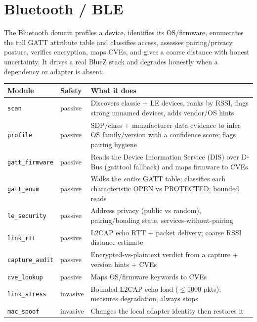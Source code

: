 \documentclass[11pt]{article}
\newif\ifintable\intablefalse
\newcommand{\code}[1]{\ifintable\texttt{#1}\else{\small\colorbox{codebg}{\texttt{#1}}}\fi}
\begin{document}
\section{Bluetooth / BLE}
The Bluetooth domain profiles a device, identifies its OS/firmware, enumerates
the full GATT attribute table and classifies access, assesses pairing/privacy
posture, verifies encryption, maps CVEs, and gives a coarse distance with honest
uncertainty. It drives a real BlueZ stack and degrades honestly when a
dependency or adapter is absent.

\begin{table}[h]
\centering\footnotesize\intabletrue
\begin{tabularx}{\textwidth}{@{}L{3.3cm} L{1.9cm} X@{}}
\toprule
\textbf{Module} & \textbf{Safety} & \textbf{What it does}\\
\midrule
\code{scan} & passive & Discovers classic + LE devices, ranks by RSSI, flags strong unnamed devices, adds vendor/OS hints\\
\code{profile} & passive & SDP/class + manufacturer-data evidence to infer OS family/version with a confidence score; flags pairing hygiene\\
\code{gatt\_firmware} & passive & Reads the Device Information Service (DIS) over D-Bus (gatttool fallback) and maps firmware to CVEs\\
\code{gatt\_enum} & passive & Walks the \emph{entire} GATT table; classifies each characteristic OPEN vs PROTECTED; bounded reads\\
\code{le\_security} & passive & Address privacy (public vs random), pairing/bonding state, services-without-pairing\\
\code{link\_rtt} & passive & L2CAP echo RTT + packet delivery; coarse RSSI distance estimate\\
\code{capture\_audit} & passive & Encrypted-vs-plaintext verdict from a capture + version hints + CVEs\\
\code{cve\_lookup} & passive & Maps OS/firmware keywords to CVEs\\
\code{link\_stress} & invasive & Bounded L2CAP echo load ($\le$1000 pkts); measures degradation, always stops\\
\code{mac\_spoof} & invasive & Changes the local adapter identity then restores it\\
\bottomrule
\end{tabularx}
\end{table}
\end{document}
